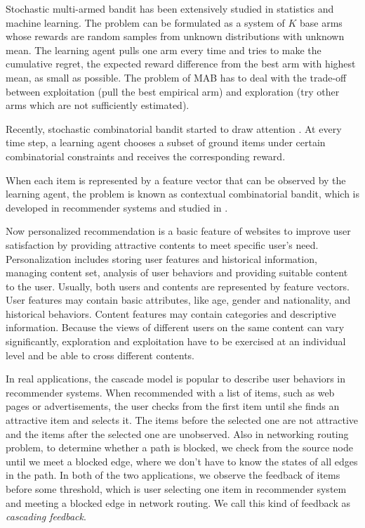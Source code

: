\documentclass{article}
\begin{document}
Stochastic multi-armed bandit has been extensively studied in statistics and machine learning. The problem can be formulated as a system of $K$ base arms whose rewards are random samples from unknown distributions with unknown mean. The learning agent pulls one arm every time and tries to make the cumulative regret, the expected reward difference from the best arm with highest mean, as small as possible. The problem of MAB has to deal with the trade-off between exploitation (pull the best empirical arm) and exploration (try other arms which are not sufficiently estimated).

Recently, stochastic combinatorial bandit started to draw attention \cite{gai2012combinatorial,chen2013combinatorial}. At every time step, a learning agent chooses a subset of ground items under certain combinatorial constraints and receives the corresponding reward. 

When each item is represented by a feature vector that can be observed by the learning agent, the problem is known as contextual combinatorial bandit, which is developed in recommender systems and studied in \cite{qin2014contextual}.

Now personalized recommendation is a basic feature of websites to improve user satisfaction by providing attractive contents to meet specific user's need. Personalization includes storing user features and historical information, managing content set, analysis of user behaviors and providing suitable content to the user. Usually, both users and contents are represented by feature vectors. User features may contain basic attributes, like age, gender and nationality, and historical behaviors. Content features may contain categories and descriptive information. Because the views of different users on the same content can vary significantly, exploration and exploitation have to be exercised at an individual level and be able to cross different contents.

In real applications, the cascade model is popular to describe user behaviors in recommender systems. When recommended with a list of items, such as web pages or advertisements, the user checks from the first item until she finds an attractive item and selects it. The items before the selected one are not attractive and the items after the selected one are unobserved. Also in networking routing problem, to determine whether a path is blocked, we check from the source node until we meet a blocked edge, where we don't have to know the states of all edges in the path. In both of the two applications, we observe the feedback of items before some threshold, which is user selecting one item in recommender system and meeting a blocked edge in network routing. We call this kind of feedback as {\it cascading feedback}. 
\end{document}
